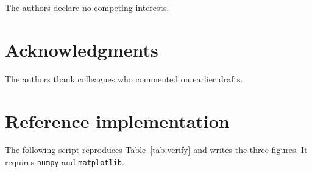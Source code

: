 \documentclass[12pt, a4paper]{article}
\theoremstyle{plain}
\theoremstyle{definition}
\theoremstyle{remark}
\begin{document}
The authors declare no competing interests.

\section*{Acknowledgments}
\label{sec:acknowledgments}

The authors thank colleagues who commented on earlier drafts.

\appendix
\section{Reference implementation}
\label{app:code}

The following script reproduces Table~\ref{tab:verify} and writes the three
figures. It requires \texttt{numpy} and \texttt{matplotlib}.
\end{document}
